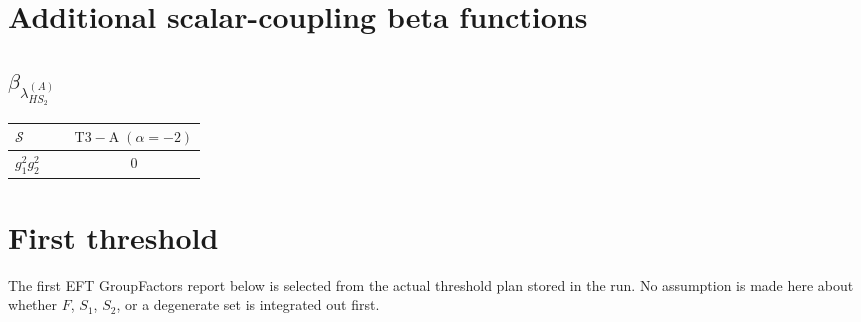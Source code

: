 \documentclass[9pt]{article}
\begin{document}
\section*{Additional scalar-coupling beta functions}
\subsection*{$ \beta_{\lambda_{HS_2}^{(A)}} $}
\begin{longtable}{@{}p{0.31\linewidth}c@{}}
\toprule
$\mathcal{S}$ & $ \mathrm{T3-A}\;(\alpha=-2) $ \\
\midrule
$ g_1^2g_2^2 $ & $ 0 $ \\
\bottomrule
\end{longtable}
\section*{First threshold}
The first EFT GroupFactors report below is selected from the actual threshold plan stored in the run.  No assumption is made here about whether $F$, $S_1$, $S_2$, or a degenerate set is integrated out first.
\end{document}
